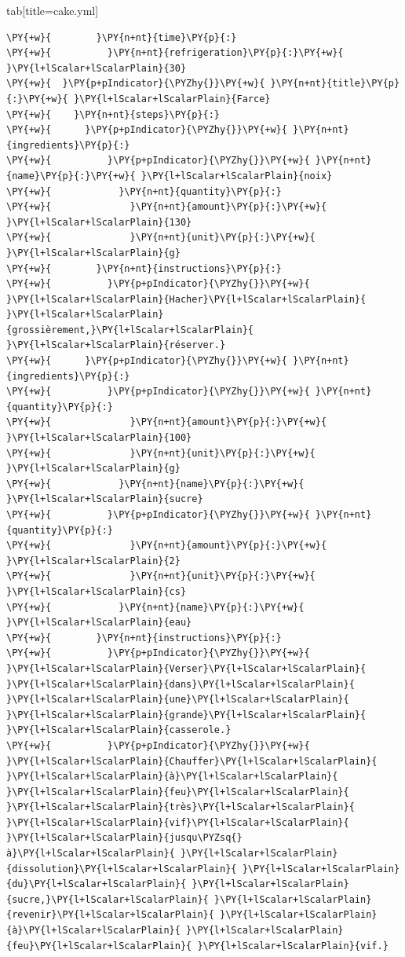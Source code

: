 \documentclass[a4paper,twoside]{article}
\begin{document}
\begin{tsdiv}{tab}[title=cake.yml]
\begin{tscode}[lang=yaml, engine=pygments]
\begin{Verbatim}[commandchars=\\\{\},breaklines, breakanywhere, commandchars=\\\{\}]
\PY{+w}{        }\PY{n+nt}{time}\PY{p}{:}
\PY{+w}{          }\PY{n+nt}{refrigeration}\PY{p}{:}\PY{+w}{ }\PY{l+lScalar+lScalarPlain}{30}
\PY{+w}{  }\PY{p+pIndicator}{\PYZhy{}}\PY{+w}{ }\PY{n+nt}{title}\PY{p}{:}\PY{+w}{ }\PY{l+lScalar+lScalarPlain}{Farce}
\PY{+w}{    }\PY{n+nt}{steps}\PY{p}{:}
\PY{+w}{      }\PY{p+pIndicator}{\PYZhy{}}\PY{+w}{ }\PY{n+nt}{ingredients}\PY{p}{:}
\PY{+w}{          }\PY{p+pIndicator}{\PYZhy{}}\PY{+w}{ }\PY{n+nt}{name}\PY{p}{:}\PY{+w}{ }\PY{l+lScalar+lScalarPlain}{noix}
\PY{+w}{            }\PY{n+nt}{quantity}\PY{p}{:}
\PY{+w}{              }\PY{n+nt}{amount}\PY{p}{:}\PY{+w}{ }\PY{l+lScalar+lScalarPlain}{130}
\PY{+w}{              }\PY{n+nt}{unit}\PY{p}{:}\PY{+w}{ }\PY{l+lScalar+lScalarPlain}{g}
\PY{+w}{        }\PY{n+nt}{instructions}\PY{p}{:}
\PY{+w}{          }\PY{p+pIndicator}{\PYZhy{}}\PY{+w}{ }\PY{l+lScalar+lScalarPlain}{Hacher}\PY{l+lScalar+lScalarPlain}{ }\PY{l+lScalar+lScalarPlain}{grossièrement,}\PY{l+lScalar+lScalarPlain}{ }\PY{l+lScalar+lScalarPlain}{réserver.}
\PY{+w}{      }\PY{p+pIndicator}{\PYZhy{}}\PY{+w}{ }\PY{n+nt}{ingredients}\PY{p}{:}
\PY{+w}{          }\PY{p+pIndicator}{\PYZhy{}}\PY{+w}{ }\PY{n+nt}{quantity}\PY{p}{:}
\PY{+w}{              }\PY{n+nt}{amount}\PY{p}{:}\PY{+w}{ }\PY{l+lScalar+lScalarPlain}{100}
\PY{+w}{              }\PY{n+nt}{unit}\PY{p}{:}\PY{+w}{ }\PY{l+lScalar+lScalarPlain}{g}
\PY{+w}{            }\PY{n+nt}{name}\PY{p}{:}\PY{+w}{ }\PY{l+lScalar+lScalarPlain}{sucre}
\PY{+w}{          }\PY{p+pIndicator}{\PYZhy{}}\PY{+w}{ }\PY{n+nt}{quantity}\PY{p}{:}
\PY{+w}{              }\PY{n+nt}{amount}\PY{p}{:}\PY{+w}{ }\PY{l+lScalar+lScalarPlain}{2}
\PY{+w}{              }\PY{n+nt}{unit}\PY{p}{:}\PY{+w}{ }\PY{l+lScalar+lScalarPlain}{cs}
\PY{+w}{            }\PY{n+nt}{name}\PY{p}{:}\PY{+w}{ }\PY{l+lScalar+lScalarPlain}{eau}
\PY{+w}{        }\PY{n+nt}{instructions}\PY{p}{:}
\PY{+w}{          }\PY{p+pIndicator}{\PYZhy{}}\PY{+w}{ }\PY{l+lScalar+lScalarPlain}{Verser}\PY{l+lScalar+lScalarPlain}{ }\PY{l+lScalar+lScalarPlain}{dans}\PY{l+lScalar+lScalarPlain}{ }\PY{l+lScalar+lScalarPlain}{une}\PY{l+lScalar+lScalarPlain}{ }\PY{l+lScalar+lScalarPlain}{grande}\PY{l+lScalar+lScalarPlain}{ }\PY{l+lScalar+lScalarPlain}{casserole.}
\PY{+w}{          }\PY{p+pIndicator}{\PYZhy{}}\PY{+w}{ }\PY{l+lScalar+lScalarPlain}{Chauffer}\PY{l+lScalar+lScalarPlain}{ }\PY{l+lScalar+lScalarPlain}{à}\PY{l+lScalar+lScalarPlain}{ }\PY{l+lScalar+lScalarPlain}{feu}\PY{l+lScalar+lScalarPlain}{ }\PY{l+lScalar+lScalarPlain}{très}\PY{l+lScalar+lScalarPlain}{ }\PY{l+lScalar+lScalarPlain}{vif}\PY{l+lScalar+lScalarPlain}{ }\PY{l+lScalar+lScalarPlain}{jusqu\PYZsq{}à}\PY{l+lScalar+lScalarPlain}{ }\PY{l+lScalar+lScalarPlain}{dissolution}\PY{l+lScalar+lScalarPlain}{ }\PY{l+lScalar+lScalarPlain}{du}\PY{l+lScalar+lScalarPlain}{ }\PY{l+lScalar+lScalarPlain}{sucre,}\PY{l+lScalar+lScalarPlain}{ }\PY{l+lScalar+lScalarPlain}{revenir}\PY{l+lScalar+lScalarPlain}{ }\PY{l+lScalar+lScalarPlain}{à}\PY{l+lScalar+lScalarPlain}{ }\PY{l+lScalar+lScalarPlain}{feu}\PY{l+lScalar+lScalarPlain}{ }\PY{l+lScalar+lScalarPlain}{vif.}

\end{Verbatim}
\end{tscode}
\end{tsdiv}
\end{document}
